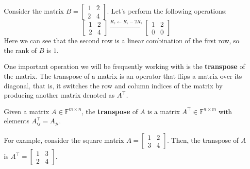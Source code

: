 \documentclass[../lecture-notes.tex]{subfiles}
\begin{document}
\begin{example}
    Consider the matrix $B = \begin{bmatrix} 1 & 2 \\ 2 & 4 \end{bmatrix}$. Let's perform the following operations:
    \begin{equation*}
        \begin{bmatrix} 
            1 & 2 \\ 
            2 & 4 
        \end{bmatrix} 
        \xrightarrow{R_2 \gets R_2 - 2R_1} 
        \begin{bmatrix} 
            1 & 2 \\ 
            0 & 0 
        \end{bmatrix}
    \end{equation*}
    Here we can see that the second row is a linear combination of the first row, so the rank of $B$ is $1$.
\end{example}

One important operation we will be frequently working with is the \textbf{transpose} of the matrix. The transpose of a matrix is an operator that flips a matrix over its diagonal, that is, it switches the row and column indices of the matrix by producing another matrix denoted as $A^{\top}$.

\begin{definition}[Transposition]
    Given a matrix $A \in \mathbb{F}^{m \times n}$, the \textbf{transpose} of $A$ is a matrix $A^{\top} \in \mathbb{F}^{n \times m}$ with elements $A^{\top}_{ij} = A_{ji}$.
\end{definition}

\begin{example}
    For example, consider the square matrix $A = \begin{bmatrix} 1 & 2 \\ 3 & 4 \end{bmatrix}$. 
    Then, the transpose of $A$ is $A^{\top} = \begin{bmatrix} 1 & 3 \\ 2 & 4 \end{bmatrix}$. 
\end{example}
\end{document}
